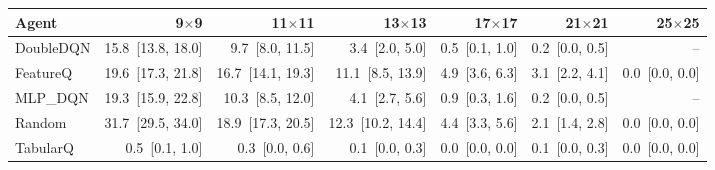 \begin{tabular}{lrrrrrr}
\toprule
Agent & 9$\times$9 & 11$\times$11 & 13$\times$13 & 17$\times$17 & 21$\times$21 & 25$\times$25 \\
\midrule
DoubleDQN & 15.8~[13.8, 18.0] & 9.7~[8.0, 11.5] & 3.4~[2.0, 5.0] & 0.5~[0.1, 1.0] & 0.2~[0.0, 0.5] & -- \\
FeatureQ & 19.6~[17.3, 21.8] & 16.7~[14.1, 19.3] & 11.1~[8.5, 13.9] & 4.9~[3.6, 6.3] & 3.1~[2.2, 4.1] & 0.0~[0.0, 0.0] \\
MLP_DQN & 19.3~[15.9, 22.8] & 10.3~[8.5, 12.0] & 4.1~[2.7, 5.6] & 0.9~[0.3, 1.6] & 0.2~[0.0, 0.5] & -- \\
Random & 31.7~[29.5, 34.0] & 18.9~[17.3, 20.5] & 12.3~[10.2, 14.4] & 4.4~[3.3, 5.6] & 2.1~[1.4, 2.8] & 0.0~[0.0, 0.0] \\
TabularQ & 0.5~[0.1, 1.0] & 0.3~[0.0, 0.6] & 0.1~[0.0, 0.3] & 0.0~[0.0, 0.0] & 0.1~[0.0, 0.3] & 0.0~[0.0, 0.0] \\
\bottomrule
\end{tabular}
